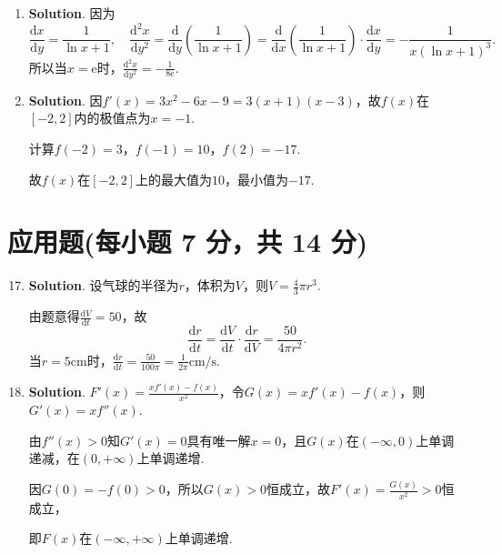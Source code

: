\documentclass[../main.tex]{subfiles}
\begin{document}
\begin{enumerate}
    \item \textbf{Solution}. 因为
          \[
              \frac{\mathrm{d}x}{\mathrm{d}y}=\frac{1}{\ln
                  x+1},\quad\frac{\mathrm{d}^{2} x}{\mathrm{d}y^{2}}=\frac{\mathrm{d}}{\mathrm{d}y}
              \left(\frac{1}{\ln x+1}\right)=\frac{\mathrm{d}}{\mathrm{d}x}\left(\frac{1}{\ln
                  x+1}\right)\cdot\frac{\mathrm{d}x}{\mathrm{d}y}=-\frac{1}{x(\ln x+1)^{3}}.
          \]
          所以当$x=\mathrm{e}$时，$\frac{\mathrm{d}^{2} x}{\mathrm{d}y^{2}}=-\frac{1}{8\mathrm{e}}$.

    \item \textbf{Solution}. 因$f'(x)=3x^{2}-6x-9=3(x+1)(x-3)$，故$f(x)$在$[-2
                  ,2]$内的极值点为$x=-1$.

          计算$f(-2)=3$，$f(-1)=10$，$f(2)=-17$.

          故$f(x)$在$[-2,2]$上的最大值为$10$，最小值为$-17$.
\end{enumerate}

\section{应用题(每小题 7 分，共 14 分)}
\begin{enumerate}
    \setcounter{enumi}{16}
    \item \textbf{Solution}. 设气球的半径为$r$，体积为$V$，则$V=\frac{4}{3}\pi r
                  ^{3}$.

          由题意得$\frac{\mathrm{d}V}{\mathrm{d}t}=50$，故
          \[
              \frac{\mathrm{d}r}{\mathrm{d}t}=\frac{\mathrm{d}V}{\mathrm{d}t}\cdot\frac{\mathrm{d}r}{\mathrm{d}V}
              =\frac{50}{4\pi r^{2}}.
          \]
          当$r=5\mathrm{cm}$时，$\frac{\mathrm{d}r}{\mathrm{d}t}=\frac{50}{100\pi}=\frac{1}{2\pi}
              \mathrm{cm/s}$.

    \item \textbf{Solution}. $F'(x)=\frac{xf'(x)-f(x)}{x^{2}}$，令$G(x)=xf'(x)-
              f(x)$，则$G'(x)=xf''(x)$.

          由$f''(x)>0$知$G'(x)=0$具有唯一解$x=0$，且$G(x)$在$(-\infty,0)$上单调递减，在$(
              0,+\infty)$上单调递增.

          因$G(0)=-f(0)>0$，所以$G(x)>0$恒成立，故$F'(x)=\frac{G(x)}{x^{2}}>0$恒成立，

          即$F(x)$在$\left(-\infty,+\infty\right)$上单调递增.
\end{enumerate}
\end{document}
